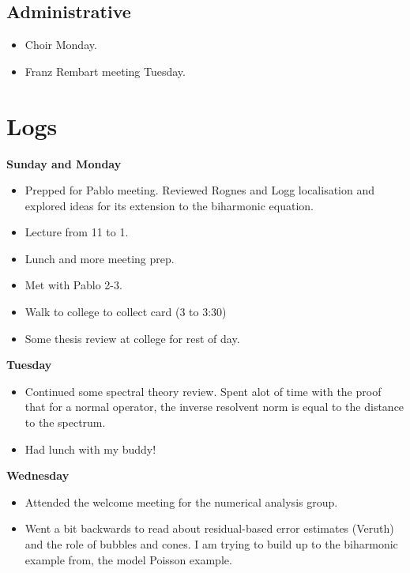 \documentclass[12pt,a4paper]{article}
\begin{document}
\subsection{Administrative}

\begin{itemize}
    \item \checkmark Choir Monday.
    \item \checkmark Franz Rembart meeting Tuesday.
\end{itemize}



\section{Logs}


\textbf{Sunday and Monday}

\begin{itemize}
    \item Prepped for Pablo meeting. Reviewed Rognes and Logg localisation and explored ideas for its extension to the biharmonic equation.
    \item Lecture from 11 to 1. 
    \item Lunch and more meeting prep.
    \item Met with Pablo 2-3.
    \item Walk to college to collect card (3 to 3:30)
    \item Some thesis review at college for rest of day.
\end{itemize}

\textbf{Tuesday}

\begin{itemize}
    \item Continued some spectral theory review. Spent alot of time with the proof that for a normal operator, the inverse resolvent norm is equal to the distance to the spectrum.
    \item Had lunch with my buddy! 
\end{itemize}

\textbf{Wednesday}

\begin{itemize}
    \item Attended the welcome meeting for the numerical analysis group. 
    \item Went a bit backwards to read about residual-based error estimates (Veruth) and the role of bubbles and cones. I am trying to build up to the biharmonic example from, the model Poisson example. 
\end{itemize}
\end{document}
